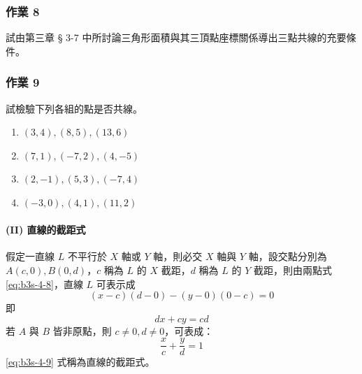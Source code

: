 \subsubsection*{作業 8}
試由第三章 § 3-7 中所討論三角形面積與其三頂點座標關係導出三點共線的充要條件。

\subsubsection*{作業 9}
試檢驗下列各組的點是否共線。
\begin{enumerate}[label=(\roman*), leftmargin=2em]
  \item $(3, 4), (8, 5), (13, 6)$
  \item $(7, 1), (-7, 2), (4, -5)$
  \item $(2, -1), (5, 3), (-7, 4)$
  \item $(-3, 0), (4, 1), (11, 2)$
\end{enumerate}

\paragraph*{(II) 直線的截距式}
假定一直線 $L$ 不平行於 $X$ 軸或 $Y$ 軸，則必交 $X$ 軸與 $Y$ 軸，設交點分別為 $A(c, 0), B(0, d)$，$c$ 稱為 $L$ 的 $X$ 截距，$d$ 稱為 $L$ 的 $Y$ 截距，則由兩點式 \eqref{eq:b3s-4-8}，直線 $L$ 可表示成
\[ (x - c)(d - 0) - (y - 0)(0 - c) = 0 \]
即
\[ dx + cy = cd \]
若 $A$ 與 $B$ 皆非原點，則 $c \neq 0, d \neq 0$，可表成：
\begin{equation}
\frac{x}{c} + \frac{y}{d} = 1
\label{eq:b3s-4-9}
\end{equation}
\eqref{eq:b3s-4-9} 式稱為直線的截距式。

